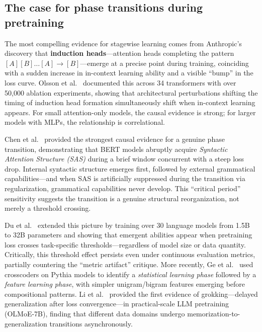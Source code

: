 \documentclass{article}
\theoremstyle{definition}
\begin{document}
\subsection{The case for phase transitions during pretraining}

The most compelling evidence for stagewise learning comes from Anthropic's discovery that \textbf{induction heads}---attention heads completing the pattern $[A][B]\ldots[A]\to[B]$---emerge at a precise point during training, coinciding with a sudden increase in in-context learning ability and a visible ``bump'' in the loss curve. Olsson et al.~\cite{olsson2022incontext} documented this across 34 transformers with over 50,000 ablation experiments, showing that architectural perturbations shifting the timing of induction head formation simultaneously shift when in-context learning appears. For small attention-only models, the causal evidence is strong; for larger models with MLPs, the relationship is correlational.

Chen et al.~\cite{chen2024sudden} provided the strongest causal evidence for a genuine phase transition, demonstrating that BERT models abruptly acquire \emph{Syntactic Attention Structure (SAS)} during a brief window concurrent with a steep loss drop. Internal syntactic structure emerges first, followed by external grammatical capabilities---and when SAS is artificially suppressed during the transition via regularization, grammatical capabilities never develop. This ``critical period'' sensitivity suggests the transition is a genuine structural reorganization, not merely a threshold crossing.

Du et al.~\cite{du2024emergent} extended this picture by training over 30 language models from 1.5B to 32B parameters and showing that emergent abilities appear when pretraining loss crosses task-specific thresholds---regardless of model size or data quantity. Critically, this threshold effect persists even under continuous evaluation metrics, partially countering the ``metric artifact'' critique. More recently, Ge et al.~\cite{ge2025evolution} used crosscoders on Pythia models to identify a \emph{statistical learning phase} followed by a \emph{feature learning phase}, with simpler unigram/bigram features emerging before compositional patterns. Li et al.~\cite{li2025grokking} provided the first evidence of grokking---delayed generalization after loss convergence---in practical-scale LLM pretraining (OLMoE-7B), finding that different data domains undergo memorization-to-generalization transitions asynchronously.
\end{document}
